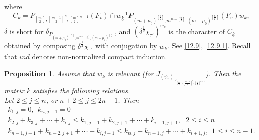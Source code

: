 \documentclass[12pts]{amsart}
\newtheorem{prop}[thm]{Proposition}
\begin{document}
where
$$
C_{\underline{k}}=P_{[\frac{m}{2}],[\frac{m+1}{2}]^n,[\frac{m}{2}]^{n-1}}(F_v)\cap w_{\underline{k}}^{-1}P_{(m+\mu_0)^{[\frac{n}{2}]},m^{n-[\frac{n}{2}]}, (m-\mu_0)^{[\frac{n}{2}]}}(F_v)w_{\underline{k}},
$$	  
$\delta$ is short for $\delta_{P_{(m+\mu_0)^{[\frac{n}{2}]},m^{n-[\frac{n}{2}]}, (m-\mu_0)^{[\frac{n}{2}]}}}$, and $(\delta^{\frac{1}{2}}\chi_{\tau'})^{w_{\underline{k}}}$ is the character of $C_{\underline{k}}$ obtained by composing $\delta^{\frac{1}{2}}\chi_{\tau'}$ with conjugation by $w_{\underline{k}}$. See \eqref{12.9}, \eqref{12.9.1}. Recall that $ind$ denotes non-normalized compact induction. 
\begin{prop}\label{prop 13.1}
Assume that $w_{\underline{k}}$ is relevant (for $J_{(\psi_v)_{V_{[\frac{m}{2}],[\frac{m+1}{2}]^n,[\frac{m}{2}]^{n-1}}}}$). Then the matrix $\underline{k}$ satisfies the following relations.\\
Let $2\leq j\leq n$, or $n+2\leq j\leq 2n-1$. Then
\begin{multline}\label{13.3}
k_{1,j}=0,\ \ k_{n,j+1}=0\\
k_{2,j}+k_{3,j}+\cdots+k_{i,j}\leq k_{1,j+1}+k_{2,j+1}+\cdots+k_{i-1,j+1},\ \ \ 2\leq i\leq n\\
k_{n-1,j+1}+k_{n-2,j+1}+\cdots+k_{i,j+1}\leq k_{n,j}+k_{n-1,j}+\cdots+k_{i+1,j},\ \ 1\leq i\leq n-1.
\end{multline}	
\end{prop}
\end{document}
